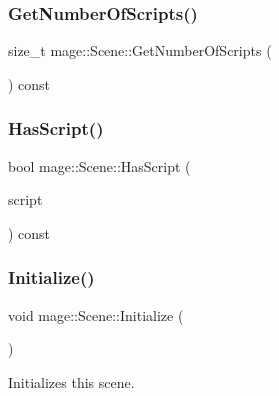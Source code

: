 \hypertarget{classmage_1_1_scene_a33cecd2fd2b393ccac84b94ec8cc53c0}{}\label{classmage_1_1_scene_a33cecd2fd2b393ccac84b94ec8cc53c0} 
\subsubsection{\texorpdfstring{Get\+Number\+Of\+Scripts()}{GetNumberOfScripts()}}
{\footnotesize\ttfamily size\+\_\+t mage\+::\+Scene\+::\+Get\+Number\+Of\+Scripts (\begin{DoxyParamCaption}{ }\end{DoxyParamCaption}) const\hspace{0.3cm}{\ttfamily [noexcept]}}

\hypertarget{classmage_1_1_scene_a9dd6c49e9db7590de1de4fbd128c78a9}{}\label{classmage_1_1_scene_a9dd6c49e9db7590de1de4fbd128c78a9} 
\subsubsection{\texorpdfstring{Has\+Script()}{HasScript()}}
{\footnotesize\ttfamily bool mage\+::\+Scene\+::\+Has\+Script (\begin{DoxyParamCaption}\item[{\hyperlink{namespacemage_a1e01ae66713838a7a67d30e44c67703e}{Shared\+Ptr}$<$ const \hyperlink{classmage_1_1_behavior_script}{Behavior\+Script} $>$}]{script }\end{DoxyParamCaption}) const}

\hypertarget{classmage_1_1_scene_a3cd12ef381ca743bf0b8f8aa2a76eb57}{}\label{classmage_1_1_scene_a3cd12ef381ca743bf0b8f8aa2a76eb57} 
\subsubsection{\texorpdfstring{Initialize()}{Initialize()}}
{\footnotesize\ttfamily void mage\+::\+Scene\+::\+Initialize (\begin{DoxyParamCaption}{ }\end{DoxyParamCaption})}

Initializes this scene. \hypertarget{classmage_1_1_scene_a1fb4a93eaa2f6a9e20594e205abb9a32}{}\label{classmage_1_1_scene_a1fb4a93eaa2f6a9e20594e205abb9a32} 
